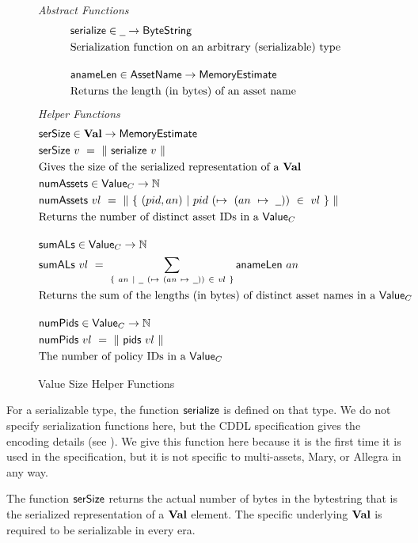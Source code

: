\begin{figure*}[h]
  \emph{Abstract Functions}
  \begin{align*}
    & \fun{serialize} \in \wcard \to \ByteString \\
    & \text{Serialization function on an arbitrary (serializable) type}
    \nextdef
    & \fun{anameLen} \in \AssetName \to \MemoryEstimate \\
    & \text{Returns the length (in bytes) of an asset name}
  \end{align*}
  \emph{Helper Functions}
  \begin{align*}
    & \fun{serSize} \in \ValMonoid \to \MemoryEstimate \\
    & \fun{serSize}~v~=~\|~\fun{serialize}~{v}~\| \\
    & \text{Gives the size of the serialized representation of a $\ValMonoid$} \\
    & \fun{numAssets} \in \Value_C \to \N \\
    & \fun{numAssets}~{vl}~=~\|~\{~(pid, an)~\vert~pid~(\mapsto~(an~\mapsto~\wcard))~\in~vl~\}~\| \\
    & \text{Returns the number of distinct asset IDs in a $\Value_C$}
    & \nextdef
    & \fun{sumALs} \in \Value_C \to \N \\
    & \fun{sumALs}~{vl}~=~ \sum_{\{~an~\vert~\wcard~(\mapsto~(an~\mapsto~\wcard))~\in~vl~\}} \fun{anameLen}~an \\
    & \text{Returns the sum of the lengths (in bytes) of distinct asset names in a $\Value_C$}
    & \nextdef
    & \fun{numPids} \in \Value_C \to \N \\
    & \fun{numPids}~{vl} ~=~ \|~\fun{pids}~{vl}~\| \\
    & \text{The number of policy IDs in a $\Value_C$}
  \end{align*}
  \caption{Value Size Helper Functions}
  \label{fig:size-helper}
\end{figure*}

For a serializable type, the function $\mathsf{serialize}$ is defined on that type. We do not
specify serialization functions here, but the CDDL specification gives the encoding
details (see \cite{alonzoCDDL}). We give this function here because it is the
first time it is used in the specification, but it is not specific to
multi-assets, Mary, or Allegra in any way.

The function $\mathsf{serSize}$ returns the actual number of bytes in the bytestring that is the
    serialized representation of a $\mathbf{Val}$ element. The specific underlying $\mathbf{Val}$
    is required to be serializable in every era.

